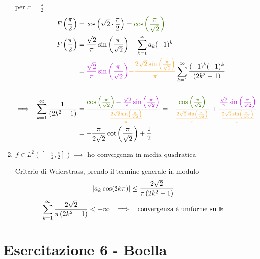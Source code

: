 \begin{enumerate}
per $x = \frac{\pi }{2}$
\begin{equation*}
\begin{aligned}
F\left(\frac{\pi }{2}\right) & = \cos\left(\sqrt{2} \cdot \frac{\pi }{2}\right) = \textcolor[rgb]{0.25,0.46,0.02}{\cos\left(\frac{\pi }{\sqrt{2}}\right)}\\
F\left(\frac{\pi }{2}\right) & = \frac{\sqrt{2}}{\pi }\sin\left(\frac{\pi }{\sqrt{2}}\right) + \sum\limits ^{\infty }_{k = 1} a_{k}(- 1)^{k}\\
 & = \textcolor[rgb]{0.74,0.06,0.88}{\frac{\sqrt{2}}{\pi }\sin\left(\frac{\pi }{\sqrt{2}}\right)}\textcolor[rgb]{0.96,0.65,0.14}{ - \frac{2\sqrt{2}\sin\left(\frac{\pi }{\sqrt{2}}\right)}{\pi }}\sum\limits ^{\infty }_{k = 1}\frac{(- 1)^{k}(- 1)^{k}}{\left(2k^{2} - 1\right)}\\
 & \\
\implies \ \ \sum\limits ^{\infty }_{k = 1}\frac{1}{\left(2k^{2} - 1\right)} & = \frac{\textcolor[rgb]{0.25,0.46,0.02}{\cos\left(\frac{\pi }{\sqrt{2}}\right)} - \textcolor[rgb]{0.74,0.06,0.88}{\frac{\sqrt{2}}{\pi }\sin\left(\frac{\pi }{\sqrt{2}}\right)}}{\textcolor[rgb]{0.96,0.65,0.14}{ - \frac{2\sqrt{2}\sin\left(\frac{\pi }{\sqrt{2}}\right)}{\pi }}} = - \frac{\textcolor[rgb]{0.25,0.46,0.02}{\cos\left(\frac{\pi }{\sqrt{2}}\right)}}{\textcolor[rgb]{0.96,0.65,0.14}{\frac{2\sqrt{2}\sin\left(\frac{\pi }{\sqrt{2}}\right)}{\pi }}} + \frac{\textcolor[rgb]{0.74,0.06,0.88}{\frac{\sqrt{2}}{\pi }\sin\left(\frac{\pi }{\sqrt{2}}\right)}}{\textcolor[rgb]{0.96,0.65,0.14}{\frac{2\sqrt{2}\sin\left(\frac{\pi }{\sqrt{2}}\right)}{\pi }}}\\
 & = - \frac{\pi }{2\sqrt{2}}\cot\left(\frac{\pi }{\sqrt{2}}\right) + \frac{1}{2}
\end{aligned}
\end{equation*}
\item $f\in L^{2}\left(\left[ - \frac{\pi }{2} ,\frac{\pi }{2}\right]\right) \implies $ ho convergenza in media quadratica

Criterio di Weierstrass, prendo il termine generale in modulo
\begin{gather*}
| a_{k}\cos(2k\pi)| \leq \frac{2\sqrt{2}}{\pi \left(2k^{2} - 1\right)}\\
\sum\limits ^{\infty }_{k = 1}\frac{2\sqrt{2}}{\pi \left(2k^{2} - 1\right)} < + \infty \ \ \implies \ \ \text{convergenza è uniforme su} \ \mathbb{R} 
\end{gather*}
\end{enumerate}
\chapter{Esercitazione 6 - Boella}
\ParteEsercizi
\Esercizio{}

